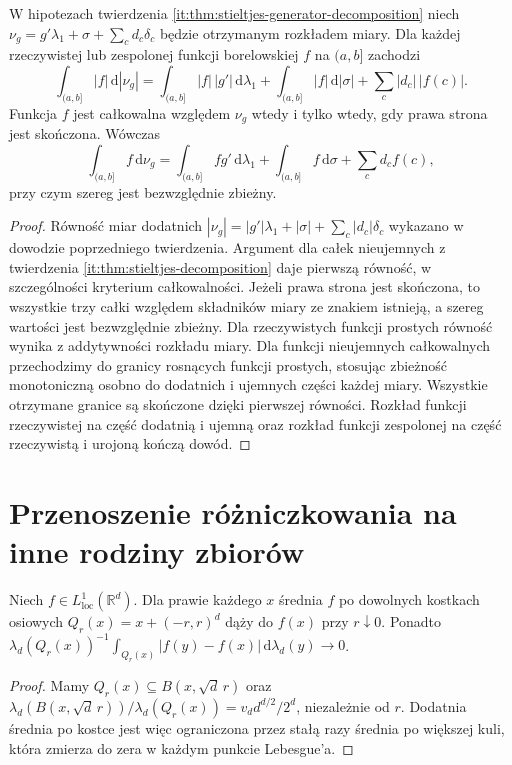 \begin{wniosek}
\label{it:cor:stieltjes-signed-integrability}
W hipotezach twierdzenia \ref{it:thm:stieltjes-generator-decomposition}
niech $\nu_g=g'\lambda_1+\sigma+\sum_c d_c\delta_c$
będzie otrzymanym rozkładem miary.
Dla każdej rzeczywistej lub zespolonej funkcji borelowskiej
$f$ na $(a,b]$ zachodzi
\[
 \int_{(a,b]}|f|\,\mathrm d|\nu_g|
 =\int_{(a,b]}|f|\,|g'|\,\mathrm d\lambda_1
  +\int_{(a,b]}|f|\,\mathrm d|\sigma|
  +\sum_c|d_c|\,|f(c)|.
\]
Funkcja $f$ jest całkowalna względem $\nu_g$ wtedy i tylko
wtedy, gdy prawa strona jest skończona. Wówczas
\[
 \int_{(a,b]}f\,\mathrm d\nu_g
 =\int_{(a,b]}fg'\,\mathrm d\lambda_1
  +\int_{(a,b]}f\,\mathrm d\sigma+\sum_c d_cf(c),
\]
przy czym szereg jest bezwzględnie zbieżny.
\end{wniosek}
\begin{proof}
Równość miar dodatnich
$|\nu_g|=|g'|\lambda_1+|\sigma|+\sum_c|d_c|\delta_c$
wykazano w dowodzie poprzedniego twierdzenia.
Argument dla całek nieujemnych z twierdzenia
\ref{it:thm:stieltjes-decomposition} daje pierwszą równość,
w szczególności kryterium całkowalności. Jeżeli prawa
strona jest skończona, to wszystkie trzy całki względem
składników miary ze znakiem istnieją, a szereg wartości
jest bezwzględnie zbieżny. Dla rzeczywistych funkcji
prostych równość wynika z addytywności rozkładu miary.
Dla funkcji nieujemnych całkowalnych przechodzimy
do granicy rosnących funkcji prostych, stosując
zbieżność monotoniczną osobno do dodatnich i ujemnych
części każdej miary. Wszystkie otrzymane granice są
skończone dzięki pierwszej równości. Rozkład funkcji
rzeczywistej na część dodatnią i ujemną oraz rozkład
funkcji zespolonej na część rzeczywistą i urojoną
kończą dowód.
\end{proof}

\section{Przenoszenie różniczkowania na inne rodziny zbiorów}
\begin{wniosek}
\label{cor:cubes-differentiation-25}
Niech $f\in L^1_{\mathrm{loc}}(\mathbb R^d)$. Dla prawie
każdego $x$ średnia $f$ po dowolnych kostkach osiowych
$Q_r(x)=x+(-r,r)^d$ dąży do $f(x)$ przy $r\downarrow0$.
Ponadto $\lambda_d(Q_r(x))^{-1}
\int_{Q_r(x)}|f(y)-f(x)|\,\mathrm d\lambda_d(y)\to0$.
\end{wniosek}
\begin{proof}
Mamy $Q_r(x)\subseteq B(x,\sqrt d\,r)$ oraz
$\lambda_d(B(x,\sqrt d\,r))/\lambda_d(Q_r(x))
=v_dd^{d/2}/2^d$, niezależnie od $r$. Dodatnia średnia
po kostce jest więc ograniczona przez stałą razy
średnia po większej kuli, która zmierza do zera
w każdym punkcie Lebesgue'a.
\end{proof}

